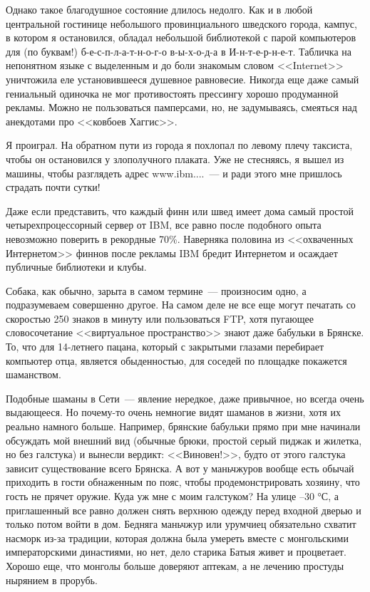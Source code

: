 \documentclass{scrbook}
\newcommand{\flqq}{<<}
\newcommand{\frqq}{>>}
\newcommand{\mdash}{~--- }
\newcommand{\ndash}{--}
\begin{document}
Однако такое благодушное состояние длилось недолго. Как и в любой центральной гостинице небольшого провинциального шведского города, кампус, в котором я остановился, обладал небольшой библиотекой с парой компьютеров для (по буквам!) б-е-с-п-л-а-т-н-о-г-о в-ы-х-о-д-а в И-н-т-е-р-н-е-т. Табличка на непонятном языке с выделенным и до боли знакомым словом {\flqq}Internet{\frqq} уничтожила еле установившееся душевное равновесие. Никогда еще даже самый гениальный одиночка не мог противостоять прессингу хорошо продуманной рекламы. Можно не пользоваться памперсами, но, не задумываясь, смеяться над анекдотами про {\flqq}ковбоев Хаггис{\frqq}.

Я проиграл. На обратном пути из города я похлопал по левому плечу таксиста, чтобы он остановился у злополучного плаката. Уже не стесняясь, я вышел из машины, чтобы разглядеть адрес www.ibm....{\mdash} и ради этого мне пришлось страдать почти сутки!

Даже если представить, что каждый финн или швед имеет дома самый простой четырехпроцессорный сервер от IBM, все равно после подобного опыта невозможно поверить в рекордные 70\%. Наверняка половина из {\flqq}охваченных Интернетом{\frqq} финнов после рекламы IBM бредит Интернетом и осаждает публичные библиотеки и клубы.

Собака, как обычно, зарыта в самом термине{\mdash}произносим одно, а подразумеваем совершенно другое. На самом деле не все еще могут печатать со скоростью 250 знаков в минуту или пользоваться FTP, хотя пугающее словосочетание {\flqq}виртуальное пространство{\frqq} знают даже бабульки в Брянске. То, что для 14-летнего пацана, который с закрытыми глазами перебирает компьютер отца, является обыденностью, для соседей по площадке покажется шаманством.

Подобные шаманы в Сети{\mdash}явление нередкое, даже привычное, но всегда очень выдающееся. Но почему-то очень немногие видят шаманов в жизни, хотя их реально намного больше. Например, брянские бабульки прямо при мне начинали обсуждать мой внешний вид (обычные брюки, простой серый пиджак и жилетка, но без галстука) и вынесли вердикт: {\flqq}Виновен!{\frqq}, будто от этого галстука зависит существование всего Брянска. А вот у маньчжуров вообще есть обычай приходить в гости обнаженным по пояс, чтобы продемонстрировать хозяину, что гость не прячет оружие. Куда уж мне с моим галстуком? На улице {\ndash}30 °С, а приглашенный все равно должен снять верхнюю одежду перед входной дверью и только потом войти в дом. Бедняга маньчжур или урумчиец обязательно схватит насморк из-за традиции, которая должна была умереть вместе с монгольскими императорскими династиями, но нет, дело старика Батыя живет и процветает. Хорошо еще, что монголы больше доверяют аптекам, а не лечению простуды нырянием в прорубь.
\end{document}
